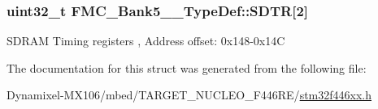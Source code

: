 \subsubsection[{\texorpdfstring{S\+D\+TR}{SDTR}}]{ uint32\+\_\+t F\+M\+C\+\_\+\+Bank5\+\_\+\_\+\+Type\+Def\+::\+S\+D\+TR\mbox{[}2\mbox{]}}\hypertarget{struct_f_m_c___bank5__6___type_def_a8438638391415aaa0dc96714f28915ae}{}\label{struct_f_m_c___bank5__6___type_def_a8438638391415aaa0dc96714f28915ae}
S\+D\+R\+AM Timing registers , Address offset\+: 0x148-\/0x14C 

The documentation for this struct was generated from the following file\+:\begin{DoxyCompactItemize}
\item 
Dynamixel-\/\+M\+X106/mbed/\+T\+A\+R\+G\+E\+T\+\_\+\+N\+U\+C\+L\+E\+O\+\_\+\+F446\+R\+E/\hyperlink{stm32f446xx_8h}{stm32f446xx.\+h}\end{DoxyCompactItemize}
